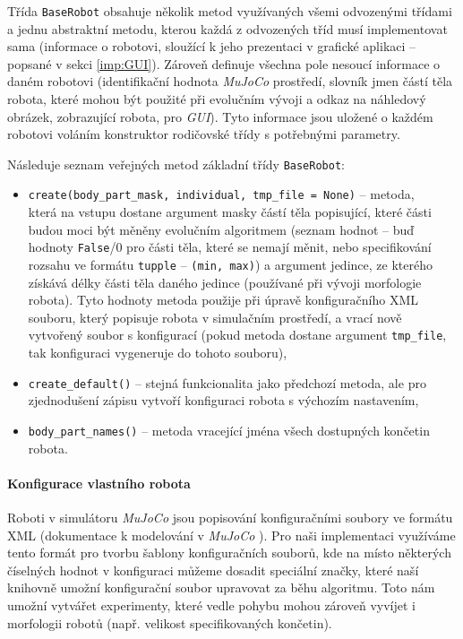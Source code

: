 Třída \texttt{BaseRobot} obsahuje několik metod využívaných všemi odvozenými
třídami a jednu abstraktní metodu, kterou každá z odvozených tříd musí
implementovat sama (informace o robotovi, sloužící k jeho prezentaci v grafické
aplikaci -- popsané v sekci \ref{imp:GUI}). Zároveň definuje všechna pole
nesoucí informace o daném robotovi (identifikační hodnota \emph{MuJoCo}
prostředí, slovník jmen částí těla robota, které mohou být použité při
evolučním vývoji a odkaz na náhledový obrázek, zobrazující robota, pro
\emph{GUI}). Tyto informace jsou uložené o každém robotovi voláním
konstruktor rodičovské třídy s potřebnými parametry.

Následuje seznam veřejných metod základní třídy
\texttt{BaseRobot}:

\begin{itemize}
    \item \texttt{create(body\_part\_mask, individual, tmp\_file = None)}
        -- metoda,\\která na vstupu dostane argument masky částí těla
        popisující, které části budou moci být měněny evolučním algoritmem
        (seznam hodnot -- buď hodnoty \texttt{False}/0 pro části těla, které se
        nemají měnit, nebo specifikování rozsahu ve formátu \texttt{tupple} --
        \texttt{(min, max)}) a argument jedince, ze kterého získává délky části
        těla daného jedince (používané při vývoji morfologie robota). Tyto
        hodnoty metoda použije při úpravě konfiguračního XML souboru, který
        popisuje robota v simulačním prostředí, a vrací nově vytvořený soubor s
        konfigurací (pokud metoda dostane argument \texttt{tmp\_file}, tak
        konfiguraci vygeneruje do tohoto souboru),
    \item \texttt{create\_default()} -- stejná funkcionalita jako předchozí
        metoda, ale pro zjednodušení zápisu vytvoří konfiguraci robota s
        výchozím nastavením,
    \item \texttt{body\_part\_names()} -- metoda vracející jména všech
        dostupných končetin robota.
\end{itemize}

\paragraph{Konfigurace vlastního robota} \label{imp:robots:symbols}
Roboti v simulátoru \emph{MuJoCo} jsou popisování konfiguračními soubory ve
formátu XML (dokumentace k modelování v \emph{MuJoCo}
\citep{modeling-mujocodocumentation}). Pro naši implementaci využíváme tento
formát pro tvorbu šablony konfiguračních souborů, kde na místo některých
číselných hodnot v konfiguraci můžeme dosadit speciální značky, které naší
knihovně umožní konfigurační soubor upravovat za běhu algoritmu. Toto nám
umožní vytvářet experimenty, které vedle pohybu mohou zároveň vyvíjet i
morfologii robotů (např. velikost specifikovaných končetin). 

